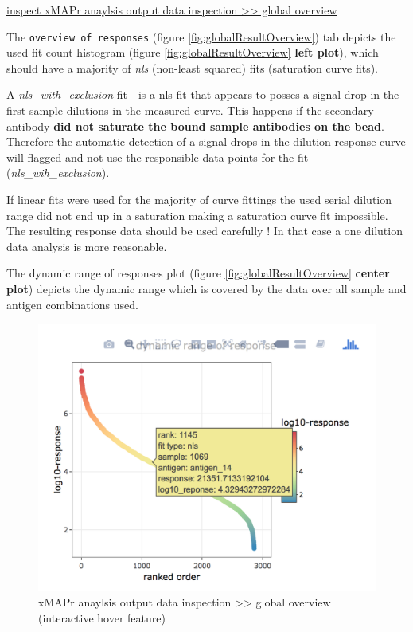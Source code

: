\documentclass[
]{book}
\begin{document}
\href{figures/global_result_overview.png}{inspect xMAPr anaylsis output data inspection \textgreater\textgreater{} global overview}

The \texttt{overview\ of\ responses} (figure \ref{fig:globalResultOverview}) tab depicts the used fit count histogram (figure \ref{fig:globalResultOverview} \textbf{left plot}), which should have a majority of \emph{nls} (non-least squared) fits (saturation curve fits).

A \emph{nls\_with\_exclusion} fit - is a nls fit that appears to posses a signal drop in the first sample dilutions in the measured curve. This happens if the secondary antibody \textbf{did not saturate the bound sample antibodies on the bead}. Therefore the automatic detection of a signal drops in the dilution response curve will flagged and not use the responsible data points for the fit (\emph{nls\_wih\_exclusion}).

If linear fits were used for the majority of curve fittings the used serial dilution range did not end up in a saturation making a saturation curve fit impossible. The resulting response data should be used carefully ! In that case a one dilution data analysis is more reasonable.

The dynamic range of responses plot (figure \ref{fig:globalResultOverview} \textbf{center plot}) depicts the dynamic range which is covered by the data over all sample and antigen combinations used.

\begin{figure}

{\centering \includegraphics[width=14.56in]{figures/global_result_overview1} 

}

\caption{xMAPr anaylsis output data inspection >> global overview (interactive hover feature)}\label{fig:globalResultOverview1}
\end{figure}
\end{document}
